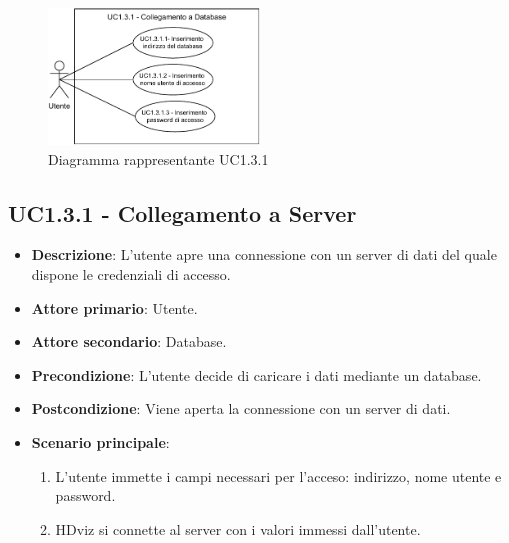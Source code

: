 \newpage
\begin{figure}[h]
    \centering
    \includegraphics[width=0.5\textwidth]{componenti/casi-duso/diagrammi/UC1.3.1.pdf}
    \caption{Diagramma rappresentante UC1.3.1}
    \label{fig:UC1.3}
\end{figure}


\subsection{UC1.3.1 - Collegamento a Server}
\label{subsec:UC1.3.1}
\begin{itemize}
    \item \textbf{Descrizione}: L'utente apre una connessione con un server di dati del quale 
                                dispone le credenziali di accesso. 

    \item \textbf{Attore primario}: Utente.
    \item \textbf{Attore secondario}: Database.
    
    \item \textbf{Precondizione}:   L'utente decide di caricare i dati mediante un database.
    \item \textbf{Postcondizione}:  Viene aperta la connessione con un server di dati.

	\item \textbf{Scenario principale}:
		\begin{enumerate}
			\item L'utente immette i campi necessari per l'acceso: indirizzo, nome utente e password.
			\item HDviz si connette al server con i valori immessi dall'utente.
        \end{enumerate}
    \end{itemize}



